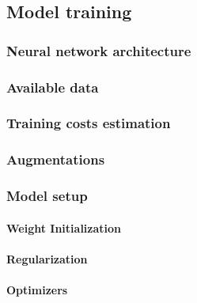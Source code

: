 \subsection{Model training}
    \subsubsection{Neural network architecture}
        
    \subsubsection{Available data}
        
    \subsubsection{Training costs estimation}
        
    \subsubsection{Augmentations}
        
    \subsubsection{Model setup}
        \paragraph{Weight Initialization}
        
        \paragraph{Regularization}
        
        \paragraph{Optimizers}
        
